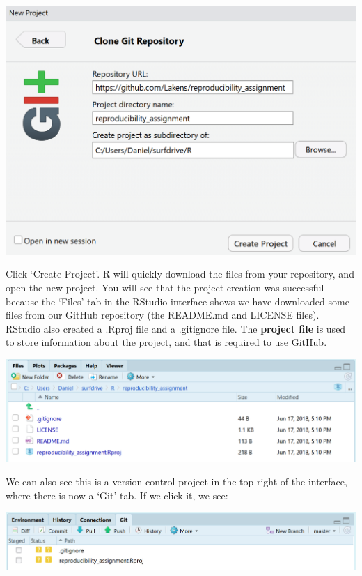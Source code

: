 \documentclass[
  oneside]{krantz}
\begin{document}
\begin{center}\includegraphics[width=1\linewidth]{images/085ad47bd94f834aca501b87baa7c0eb} \end{center}

Click `Create Project'. R will quickly download the files from your repository,
and open the new project. You will see that the project creation was successful
because the `Files' tab in the RStudio interface shows we have downloaded some
files from our GitHub repository (the README.md and LICENSE files). RStudio also
created a .Rproj file and a .gitignore file. The \textbf{project file} is used to
store information about the project, and that is required to use GitHub.

\begin{center}\includegraphics[width=1\linewidth]{images/386831c4f089bbb56758718619859308} \end{center}

We can also see this is a version control project in the top right of the
interface, where there is now a `Git' tab. If we click it, we see:

\begin{center}\includegraphics[width=1\linewidth]{images/16361987bd66eec35a5b82b2efb9617b} \end{center}
\end{document}
